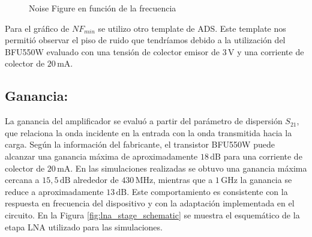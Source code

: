 \begin{figure}[htbp]
\centering
{}
\caption{Noise Figure en función de la frecuencia}
\label{fig:nf_vs_freq}
\end{figure}
Para el gráfico de $NF_{min}$ se utilizo otro template de ADS. Este template nos permitió observar el piso de ruido que tendríamos debido a la utilización del BFU550W evaluado con una tensión de colector emisor de $3\,\text{V}$ y una corriente de colector de $20\,\text{mA}$.
\subsection{Ganancia:}
La ganancia del amplificador se evaluó a partir del parámetro de dispersión $S_{21}$, que relaciona la onda incidente en la entrada con la onda transmitida hacia la carga. Según la información del fabricante, el transistor BFU550W puede alcanzar una ganancia máxima de aproximadamente $18\,\text{dB}$ para una corriente de colector de $20\,\text{mA}$.
En las simulaciones realizadas se obtuvo una ganancia máxima cercana a $15{,}5\,\text{dB}$ alrededor de $430\,\text{MHz}$, mientras que a $1\,\text{GHz}$ la ganancia se reduce a aproximadamente $13\,\text{dB}$. Este comportamiento es consistente con la respuesta en frecuencia del dispositivo y con la adaptación implementada en el circuito. En la Figura \ref{fig:lna_stage_schematic} se muestra el esquemático de la etapa LNA utilizado para las simulaciones.

